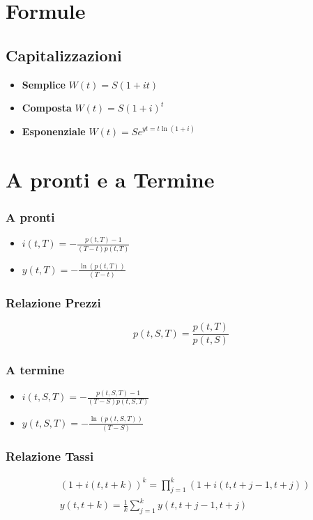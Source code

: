 \documentclass[a4paper,notitlepage]{report}%
\begin{document}
\section*{Formule}

\begin{multicols*}{2}

\subsection*{Capitalizzazioni}
    \begin{itemize}
        \item \textbf{Semplice} $ W(t) = S(1+it)$ 
        \item \textbf{Composta} $ W(t) = S(1+i)^t$
        \item \textbf{Esponenziale} $ W(t) = Se^{yt = t \ln(1+i)}$
    \end{itemize}

\section*{A pronti e a Termine}

    \subsubsection*{A pronti}
    \begin{itemize}
        \item $i(t,T)=-\frac{p(t,T)-1}{(T-t)p(t,T)}$
        \item $y(t,T)=-\frac{\ln(p(t,T))}{(T-t)}$
    \end{itemize}

    \subsubsection*{Relazione Prezzi}
    \[
        p(t,S,T)=\frac{p(t,T)}{p(t,S)}
    \]

    \subsubsection*{A termine}
    \begin{itemize}
        \item $i(t,S,T)=-\frac{p(t,S,T)-1}{(T-S)p(t,S,T)}$
        \item $y(t,S,T)=-\frac{\ln(p(t,S,T))}{(T-S)}$
    \end{itemize}

    \subsubsection*{Relazione Tassi}
    \begin{align*}
        &(1+i(t,t+k))^k=\prod_{j=1}^k (1+i(t,t+j-1,t+j)) \\
        &y(t,t+k)=\frac{1}{k}\sum_{j=1}^k y(t,t+j-1,t+j)
    \end{align*}


\end{multicols*}
\end{document}
